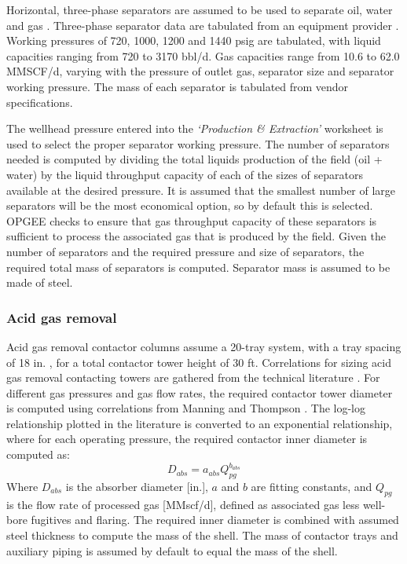 \documentclass[11pt]{report}
\newcommand{\marg}[1]{{\footnotesize\textit{\textcolor{stanford}{'#1'}}}}
\newcommand{\marginnote}[1]{\marginpar{\marg{#1}}}
\newcommand{\sheet}[1]{\textit{`{#1}'}}
\begin{document}
{{{{Horizontal, three-phase separators are assumed to be used to separate oil, water and gas \marginnote{Embodied Emissions 3.3.1}. Three-phase separator data are tabulated from an equipment provider \cite{Surfaceequip2014}. Working pressures of 720, 1000, 1200 and 1440 psig are tabulated, with liquid capacities ranging from 720 to 3170 bbl/d. Gas capacities range from 10.6 to 62.0 MMSCF/d, varying with the pressure of outlet gas, separator size and separator working pressure. The mass of each separator is tabulated from vendor specifications.

The wellhead pressure entered into the \sheet{Production \& Extraction} worksheet \marginnote{Embodied Emissions 3.3.2} is used to select the proper separator working pressure. The number of separators needed is computed by dividing the total liquids production of the field (oil + water) by the liquid throughput capacity of each of the sizes of separators available at the desired pressure. \marginnote{Embodied Emissions 3.3.5 - 3.3.7} It is assumed that the smallest number of large separators will be the most economical option, so by default this is selected. OPGEE checks to ensure that gas throughput capacity of these separators is sufficient to process the associated gas that is produced by the field. \marginnote{Embodied Emissions 3.3.8} Given the number of separators and the required pressure and size of separators, the required total mass of separators is computed. Separator mass is assumed to be made of steel.

\subsubsection{Acid gas removal}

Acid gas \marginnote{Embodied Emissions 3.4.1} removal contactor columns assume a 20-tray system, with a tray spacing of 18 in. \cite[p.116]{Manning1991}, for a total contactor tower height of 30 ft. Correlations for sizing acid gas removal contacting towers are gathered from the technical literature \cite{Manning1991}. For different gas pressures and gas flow rates, the required contactor tower diameter is \marginnote{Embodied Emissions 3.4.4} computed using correlations from Manning and Thompson \cite{Manning1991}. The log-log relationship plotted in the literature is converted to an exponential relationship, where for each operating pressure, the required contactor inner diameter is computed as:\marginnote{Embodied Emissions 3.4.5}
\begin{equation}
D_{abs} = a_{abs} Q_{pg}^{b_{abs}}
\end{equation}
Where $D_{abs}$ is the absorber diameter [in.], $a$ and $b$ are fitting constants, and $Q_{pg}$ is the flow rate of processed gas \marginnote{Gas Balance M23} [MMscf/d], defined as associated gas less well-bore fugitives and flaring. The required inner diameter is combined with assumed steel thickness \marginnote{Embodied Emissions 3.4.6} to compute the mass of the shell. The mass of contactor trays and auxiliary piping \marginnote{Embodied Emissions 3.4.9-10} is assumed by default to equal the mass of the shell. 

}}}}
\end{document}
